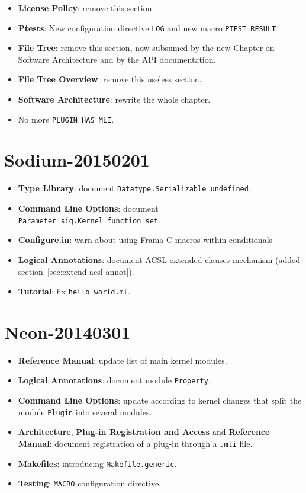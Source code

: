 \begin{itemize}
\item \textbf{License Policy}: remove this section.
\item \textbf{Ptests}: New configuration directive \texttt{LOG} and new macro
  \texttt{PTEST\_RESULT}
\item \textbf{File Tree}: remove this section, now subsumed by the new Chapter
  on Software Architecture and by the API documentation.
\item \textbf{File Tree Overview}: remove this useless section.
\item \textbf{Software Architecture}: rewrite the whole chapter.
\item No more \texttt{PLUGIN\_HAS\_MLI}.
\end{itemize}

\section*{Sodium-20150201}

\begin{itemize}
\item \textbf{Type Library}: document
  \texttt{Datatype.Serializable\_undefined}.
\item \textbf{Command Line Options}: document
  \texttt{Parameter\_sig.Kernel\_function\_set}.
\item \textbf{Configure.in}: warn about using Frama-C macros within conditionals
\item \textbf{Logical Annotations}: document ACSL extended clauses mechanism
  (added section~\ref{sec:extend-acsl-annot}).
\item \textbf{Tutorial}: fix \texttt{hello\_world.ml}.
\end{itemize}

\section*{Neon-20140301}

\begin{itemize}
\item \textbf{Reference Manual}: update list of main kernel modules.
\item \textbf{Logical Annotations}: document module \texttt{Property}.
\item \textbf{Command Line Options}: update according to kernel changes that
  split the module \texttt{Plugin} into several modules.
\item \textbf{Architecture}, \textbf{Plug-in Registration and Access} and
  \textbf{Reference Manual}: document registration of a plug-in through a
  \texttt{.mli} file.
\item \textbf{Makefiles}: introducing \texttt{Makefile.generic}.
\item \textbf{Testing}: \texttt{MACRO} configuration directive.
\end{itemize}

